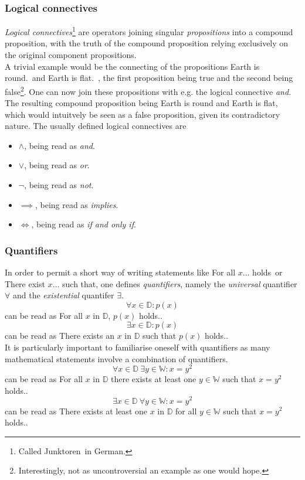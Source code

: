 \documentclass[12pt]{article}
\begin{document}
\subsubsection{Logical connectives}
\textit{Logical connectives}\footnote{Called \glqq Junktoren\grqq \ in German.} are operators joining singular \textit{propositions} into a compound proposition, with the truth of the compound proposition relying exclusively on the original component propositions.\\ A trivial example would be the connecting of the propositions \glqq Earth is round.\grqq \ and \glqq Earth is flat.\grqq \ , the first proposition being true and the second being false\footnote{Interestingly, not as uncontroversial an example as one would hope.}. One can now join these propositions with e.g. the logical connective \textit{and}. The resulting compound proposition being \glqq Earth is round and Earth is flat\grqq, which would intuitvely be seen as a false proposition, given its contradictory nature. The usually defined logical connectives are
\begin{itemize}
\item $\land$, being read as \textit{and}.

\item $\lor$, being read as \textit{or}.

\item $\neg$, being read as \textit{not}.

\item $\implies$, being read as \textit{implies}.

\item $\iff$, being read as \textit{if and only if}.
\end{itemize}

\subsubsection{Quantifiers}
In order to permit a short way of writing statements like \glqq For all $x \dots$ holds\grqq \ or \glqq There exist $x \dots$ such that\grqq, one defines \textit{quantifiers}, namely the \textit{universal} quantifier $\forall$ and the \textit{existential} quantifer $\exists$.
\[
\forall x \in \mathbb{D} : p(x) 
\]
can be read as \glqq For all $x$ in $\mathbb{D}$, $ p(x)$ holds.\grqq .
\[
\exists x \in \mathbb{D} : p(x) 
\]
can be read as \glqq There exists an $x$ in $\mathbb{D}$ such that $p(x)$ holds.\grqq .\\
It is particularly important to familiarise oneself with quantifiers as many mathematical statements involve a combination of quantifiers.
\[
\forall x \in \mathbb{D} \ \exists y \in \mathbb{W} : x = y^2 
\]
can be read as \glqq For all $x$ in $\mathbb{D}$ there exists at least one $y \in \mathbb{W}$ such that $x = y^2$ holds.\grqq .
\[
\exists x \in \mathbb{D} \ \forall y \in \mathbb{W} : x = y^2 
\]
can be read as \glqq There exists at least one $x$ in $\mathbb{D}$ for all $y \in \mathbb{W}$ such that $x = y^2$ holds.\grqq .
\end{document}
